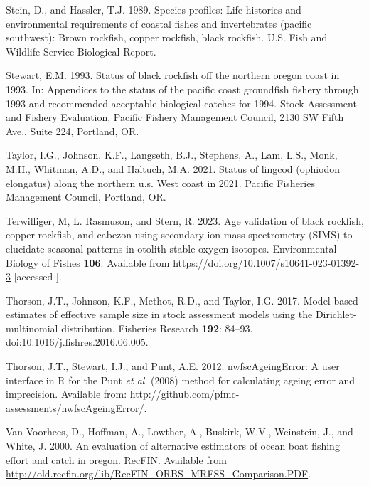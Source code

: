 \documentclass[11pt,
  english,
  letterpaper,
]{article}
\newlength{\cslhangindent}
\newenvironment{CSLReferences}[2] %
 {%
  \setlength{\parindent}{0pt}
  \ifodd #1 \everypar{\setlength{\hangindent}{\cslhangindent}}\ignorespaces\fi
  \ifnum #2 > 0
  \setlength{\parskip}{#2\baselineskip}
  \fi
 }%
 {}
\begin{document}
\begin{CSLReferences}{1}{0}
\leavevmode{}%
Stein, D., and Hassler, T.J. 1989. Species profiles: Life histories and environmental requirements of coastal fishes and invertebrates (pacific southwest): Brown rockfish, copper rockfish, black rockfish. U.S. Fish and Wildlife Service Biological Report.

\leavevmode{}%
Stewart, E.M. 1993. Status of black rockfish off the northern oregon coast in 1993. In: Appendices to the status of the pacific coast groundfish fishery through 1993 and recommended acceptable biological catches for 1994. Stock Assessment and Fishery Evaluation, Pacific Fishery Management Council, 2130 SW Fifth Ave., Suite 224, Portland, OR.

\leavevmode{}%
Taylor, I.G., Johnson, K.F., Langseth, B.J., Stephens, A., Lam, L.S., Monk, M.H., Whitman, A.D., and Haltuch, M.A. 2021. Status of lingcod (ophiodon elongatus) along the northern u.s. West coast in 2021. Pacific Fisheries Management Council, Portland, {OR}.

\leavevmode{}%
Terwilliger, M, L. Rasmuson, and Stern, R. 2023. Age validation of black rockfish, copper rockfish, and cabezon using secondary ion mass spectrometry (SIMS) to elucidate seasonal patterns in otolith stable oxygen isotopes. Environmental Biology of Fishes \textbf{106}. Available from \url{https://doi.org/10.1007/s10641-023-01392-3} {[}accessed {]}.

\leavevmode{}%
Thorson, J.T., Johnson, K.F., Methot, R.D., and Taylor, I.G. 2017. Model-based estimates of effective sample size in stock assessment models using the {Dirichlet}-multinomial distribution. Fisheries Research \textbf{192}: 84--93. doi:\href{https://doi.org/10.1016/j.fishres.2016.06.005}{10.1016/j.fishres.2016.06.005}.

\leavevmode{}%
Thorson, J.T., Stewart, I.J., and Punt, A.E. 2012. {nwfscAgeingError}: A user interface in {R} for the {P}unt \emph{et al}. (2008) method for calculating ageing error and imprecision. Available from: http://github.com/pfmc-assessments/nwfscAgeingError/.

\leavevmode{}%
Van Voorhees, D., Hoffman, A., Lowther, A., Buskirk, W.V., Weinstein, J., and White, J. 2000. An evaluation of alternative estimators of ocean boat fishing effort and catch in oregon. RecFIN. Available from \url{http://old.recfin.org/lib/RecFIN_ORBS_MRFSS_Comparison.PDF}.


\end{CSLReferences}
\end{document}
